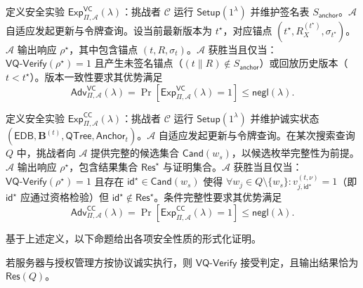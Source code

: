 \begin{definition}[版本一致性]\label{def:vq-version-consistency}
定义安全实验 $\mathsf{Exp}_{\Pi,\mathcal{A}}^{\mathsf{VC}}(\lambda)$：挑战者 $\mathcal{C}$ 运行 $\mathsf{Setup}(1^\lambda)$ 并维护签名表 $S_{\mathsf{anchor}}$。$\mathcal{A}$ 自适应发起更新与令牌查询。设当前最新版本为 $t^\star$，对应锚点 $(t^\star,R_X^{(t^\star)},\sigma_{t^\star})$。$\mathcal{A}$ 输出响应 $\rho^\star$，其中包含锚点 $(t,R,\sigma_t)$。$\mathcal{A}$ 获胜当且仅当：$\mathsf{VQ\text{-}Verify}(\rho^\star)=1$ 且产生未签名锚点（$(t\|R)\notin S_{\mathsf{anchor}}$）或回放历史版本（$t<t^\star$）。版本一致性要求其优势满足
\begin{equation}
\mathsf{Adv}_{\Pi,\mathcal{A}}^{\mathsf{VC}}(\lambda)=\Pr\!\left[\mathsf{Exp}_{\Pi,\mathcal{A}}^{\mathsf{VC}}(\lambda)=1\right]\le \mathsf{negl}(\lambda)\text{.}
\end{equation}
\end{definition}

\begin{definition}[条件完整性]\label{def:vq-conditional-completeness}
定义安全实验 $\mathsf{Exp}_{\Pi,\mathcal{A}}^{\mathsf{CC}}(\lambda)$：挑战者 $\mathcal{C}$ 运行 $\mathsf{Setup}(1^\lambda)$ 并维护诚实状态 $(\mathsf{EDB},\mathbf{B}^{(t)},\mathsf{QTree},\mathsf{Anchor}_t)$。$\mathcal{A}$ 自适应发起更新与令牌查询。在某次搜索查询 $Q$ 中，挑战者向 $\mathcal{A}$ 提供完整的候选集合 $\mathsf{Cand}(w_s)$，以候选枚举完整性为前提。$\mathcal{A}$ 输出响应 $\rho^\star$，包含结果集合 $\mathsf{Res}^\star$ 与证明集合。$\mathcal{A}$ 获胜当且仅当：$\mathsf{VQ\text{-}Verify}(\rho^\star)=1$ 且存在 $\mathsf{id}^\star\in\mathsf{Cand}(w_s)$ 使得 $\forall w_j\in Q\setminus\{w_s\}:v_{j,\mathsf{id}^\star}^{(t,\nu)}=1$（即 $\mathsf{id}^\star$ 应通过资格检验）但 $\mathsf{id}^\star\notin\mathsf{Res}^\star$。条件完整性要求其优势满足
\begin{equation}
\mathsf{Adv}_{\Pi,\mathcal{A}}^{\mathsf{CC}}(\lambda) = \Pr\!\left[\mathsf{Exp}_{\Pi,\mathcal{A}}^{\mathsf{CC}}(\lambda)=1\right] \le \mathsf{negl}(\lambda)\text{.}
\end{equation}
\end{definition}

基于上述定义，以下命题给出各项安全性质的形式化证明。

\begin{proposition}[正确性]\label{prop:vq-correct}
若服务器与授权管理方按协议诚实执行，则 $\mathsf{VQ\text{-}Verify}$ 接受判定，且输出结果恰为 $\mathsf{Res}(Q)$。
\end{proposition}


